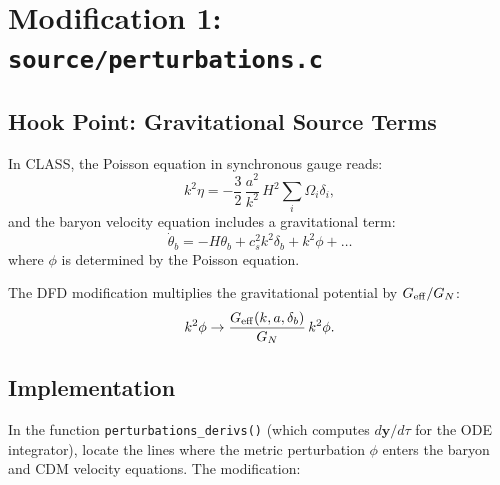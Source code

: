 \documentclass[11pt]{article}
\theoremstyle{definition}
\theoremstyle{remark}
\newcommand{\Geff}{G_{\rm eff}}
\begin{document}
\section{Modification 1: \texttt{source/perturbations.c}}

\subsection{Hook Point: Gravitational Source Terms}

In CLASS, the Poisson equation in synchronous gauge reads:
\begin{equation}
k^2\eta = -\frac{3}{2}\,\frac{a^2}{k^2}\,H^2 \sum_i \Omega_i \delta_i,
\end{equation}
and the baryon velocity equation includes a gravitational term:
\begin{equation}
\dot\theta_b = -H\theta_b + c_s^2 k^2 \delta_b + k^2\phi + \ldots
\end{equation}
where $\phi$ is determined by the Poisson equation.

The DFD modification multiplies the gravitational potential by
$\Geff/G_N$:
\begin{equation}
k^2\phi \to \frac{\Geff(k,a,\delta_b)}{G_N}\,k^2\phi.
\end{equation}

\subsection{Implementation}

In the function \texttt{perturbations\_derivs()} (which computes
$d\mathbf{y}/d\tau$ for the ODE integrator), locate the lines where
the metric perturbation $\phi$ enters the baryon and CDM velocity
equations. The modification:
\end{document}
